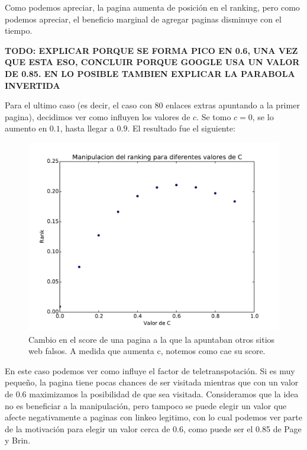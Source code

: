Como podemos apreciar, la pagina aumenta de posición en el ranking, pero como podemos apreciar, el beneficio marginal de agregar paginas disminuye con el tiempo.

\textbf{TODO: EXPLICAR PORQUE SE FORMA PICO EN 0.6, UNA VEZ QUE ESTA ESO, CONCLUIR PORQUE GOOGLE USA UN VALOR DE 0.85. EN LO POSIBLE TAMBIEN EXPLICAR LA PARABOLA INVERTIDA}

Para el ultimo caso (es decir, el caso con 80 enlaces extras apuntando a la primer pagina), decidimos ver como influyen los valores de $c$. Se tomo $c = 0$, se lo aumento en $0.1$, hasta llegar a $0.9$. El resultado fue el siguiente:

\begin{figure}[H]
\centering
\includegraphics[scale=0.7]{images/manipulacionC.pdf}
\caption{Cambio en el score de una pagina a la que la apuntaban otros sitios web falsos. A medida que aumenta c, notemos como cae su score.}
\label{timePageRank}
\end{figure}

En este caso podemos ver como influye el factor de teletranspotación. Si es muy pequeño, la pagina tiene pocas chances de ser visitada mientras que con un valor de 0.6 maximizamos la posibilidad de que sea visitada. Consideramos que la idea no es beneficiar a la manipulación, pero tampoco se puede elegir un valor que afecte negativamente a paginas con linkeo legitimo, con lo cual podemos ver parte de la motivación para elegir un valor cerca de 0.6, como puede ser el 0.85 de Page y Brin.
